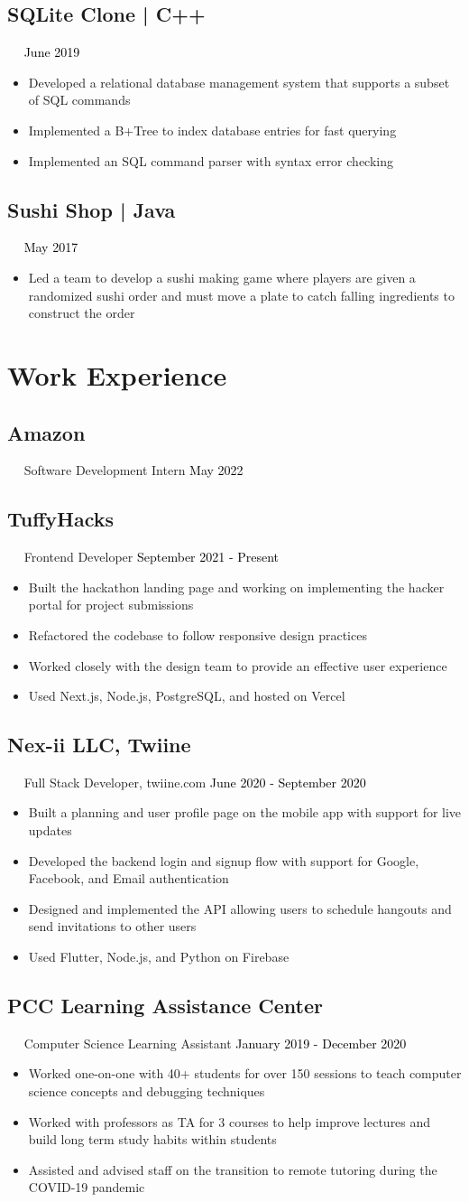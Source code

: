 \documentclass{article}
\newcommand{\resumesection}[3]{
    \subsection*{#1}
    \ 
    \ 
    \small
    \textcolor{csufgrey}{#2}
    \normalsize
    \hfill
    \textcolor{black}{#3}
    \normalsize
}
\begin{document}
\resumesection{SQLite Clone | C++}{}{June 2019}
\begin{itemize}
    \item Developed a relational database management system that supports a subset of SQL commands
    \item Implemented a B+Tree to index database entries for fast querying
    \item Implemented an SQL command parser with syntax error checking
\end{itemize}

\resumesection{Sushi Shop | Java}{}{May 2017}
\begin{itemize}
    \item Led a team to develop a sushi making game where players are given a randomized sushi order and must move a plate to catch falling ingredients to construct the order
\end{itemize}
\hfill
\section*{Work Experience}
\resumesection{Amazon}{Software Development Intern}{May 2022}
\resumesection{TuffyHacks}{Frontend Developer}{September 2021 - Present}
\begin{itemize}
    \item Built the hackathon landing page and working on implementing the hacker portal for project submissions
    \item Refactored the codebase to follow responsive design practices
    \item Worked closely with the design team to provide an effective user experience
    \item Used Next.js, Node.js, PostgreSQL, and hosted on Vercel
\end{itemize}
\resumesection{Nex-ii LLC, Twiine}{Full Stack Developer, twiine.com}{June 2020 - September 2020}
\begin{itemize}
    \item Built a planning and user profile page on the mobile app with support for live updates
    \item Developed the backend login and signup flow with support for Google, Facebook, and Email authentication
    \item Designed and implemented the API allowing users to schedule hangouts and send invitations to other users
    \item Used Flutter, Node.js, and Python on Firebase
\end{itemize}
\resumesection{PCC Learning Assistance Center}{Computer Science Learning Assistant}{January 2019 - December 2020}
\begin{itemize}
    \item Worked one-on-one with 40+ students for over 150 sessions to teach computer science concepts and debugging techniques
    \item Worked with professors as TA for 3 courses to help improve lectures and build long term study habits within students
    \item Assisted and advised staff on the transition to remote tutoring during the COVID-19 pandemic
\end{itemize}
\hfill
\end{document}
